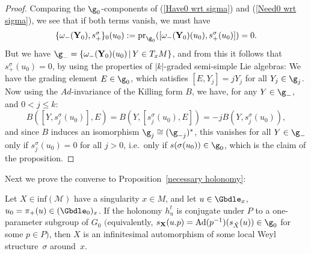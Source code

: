 \begin{proof}
 Comparing the $\g_0$-components of (\ref{Have0 wrt sigma}) and (\ref{Need0 wrt sigma}), we see that if both terms vanish, we must have
\begin{gather*}
\{\omega_{-}(\mathbf{Y}_0),s^{\sigma}_+\}_0(u_0) := \mathrm{pr}_{\g_0}([\omega_{-}(\mathbf{Y}_0)(u_0),s^{\sigma}_+(u_0)]) = 0.
\end{gather*}
But we have $\g_- = \{\omega_{-}(\mathbf{Y}_0)(u_0) \, \vert \, Y \in T_xM\}$, and from this it follows that $s^{\sigma}_+(u_0) = 0$, by using the properties of $\vert k \vert$-graded semi-simple Lie algebras: We have the grading element $E \in \g_0$, which satisf\/ies $[E,Y_j] = jY_j$ for all $Y_j \in \g_j$. Now using the $Ad$-invariance of the Killing form $B$, we have, for any $Y \in \g_-$, and $0 < j \leq k$:
\[
B([Y,s^{\sigma}_j(u_0)],E) = B(Y,[s^{\sigma}_j(u_0),E]) = -jB(Y,s^{\sigma}_j(u_0)),
\]
and since $B$ induces an isomorphism $\g_j \cong (\g_{-j})^*$, this vanishes for all $Y \in \g_-$ only if $s^{\sigma}_j(u_0) = 0$ for all $j > 0$, i.e.\ only if $s(\sigma(u_0)) \in \g_0$, which is the claim of the proposition.
\end{proof}

Next we prove the converse to Proposition~\ref{necessary holonomy}:

\begin{Proposition} \label{sufficient holonomy} Let $X \in \mathrm{inf}(\mathcal{M})$ have a singularity $x \in M$, and let $u \in \Gbdle_x$, $u_0 = \pi_+(u) \in (\Gbdle_0)_x$. If the holonomy $h_u^t$ is conjugate under $P$ to a one-parameter subgroup of $G_0$ $($equivalently, $s_{\mathbf{X}}(u.p) = \mathrm{Ad}(p^{-1})(s_{\tilde{X}}(u)) \in \g_0$ for some $p \in P)$, then $X$ is an infinitesimal automorphism of some local Weyl structure~$\sigma$ around~$x$.
\end{Proposition}

